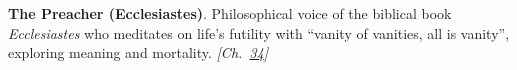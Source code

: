 \textbf{The Preacher (Ecclesiastes)}. Philosophical voice of the biblical book \emph{Ecclesiastes} who meditates on life's futility with ``vanity of vanities, all is vanity'', exploring meaning and mortality. \emph{[Ch.~\hyperref[ch:boltzmannbrain]{34}]}

